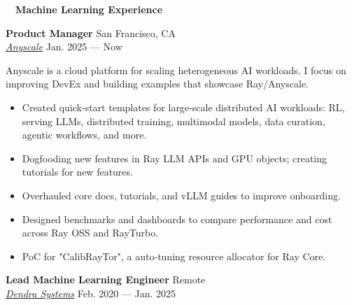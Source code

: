 \documentclass[a4paper,12pt]{article}
\newcommand{\resheading}[1]{{\hspace{-9pt} \colorbox{mygrey}{\begin{minipage}{\textwidth}{\textmd{~~\large \textbf{#1} \vphantom{p\^{E}}}}\end{minipage}}\vspace{6pt}} }
\newcommand{\ressubheading}[4]{{\begin{minipage}{\textwidth}
                                    \textbf{#1} \hfill #2 \\
                                    \textit{#3} \hfill #4 \\
\end{minipage}}}
\begin{document}
%


    \resheading{Machine Learning Experience}

    \ressubheading{Product Manager}{San Francisco, CA}{\href{https://www.anyscale.com/}{Anyscale}}{Jan. 2025 --- Now}

    \vspace{-6pt} Anyscale is a cloud platform for scaling heterogeneous AI workloads. I focus on improving DevEx and building examples that showcase Ray/Anyscale.
    \begin{itemize}
    \item	Created quick-start templates for large-scale distributed AI workloads: RL, serving LLMs, distributed training, multimodal models, data curation, agentic workflows, and more.
    \item   Dogfooding new features in Ray LLM APIs and GPU objects; creating tutorials for new features.
	\item	Overhauled core docs, tutorials, and vLLM guides to improve onboarding.
	\item	Designed benchmarks and dashboards to compare performance and cost across Ray OSS and RayTurbo.
	\item   PoC for "CalibRayTor", a auto-tuning resource allocator for Ray Core.
    \end{itemize}
    \ressubheading{Lead Machine Learning Engineer}{Remote}{\href{dendra.io}{Dendra Systems}}{Feb. 2020 --- Jan. 2025}
\end{document}
